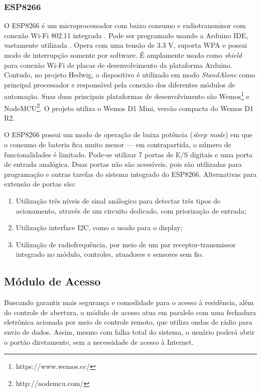 \subsubsection{ESP8266 \label{subsec:esp8266}}
O ESP8266 é um microprocessador com baixo consumo e radiotransmisor com conexão Wi-Fi 802.11 integrada \cite{espressif}. Pode ser programado usando a Arduino IDE, vastamente utilizada \cite{thomsen}. Opera com uma tensão de 3.3 V, suporta WPA e possui modo de interrupção somente por software. É amplamente usado como \textit{shield} para conexão Wi-Fi de placas de desenvolvimento da plataforma Arduino. Contudo, no projeto Hedwig, o dispositivo é utilizado em modo \textit{StandAlone} como principal processador e responsável pela conexão dos diferentes módulos de automação. Suas duas principais plataformas de desenvolvimento são Wemos\footnote{https://www.wemos.cc/} e NodeMCU\footnote{http://nodemcu.com/}. O projeto utiliza o Wemos D1 Mini, versão compacta do Wemos D1 R2.

O ESP8266 possui um modo de operação de baixa potência (\textit{sleep mode}) em que o consumo de bateria fica muito menor --- em contrapartida, o número de funcionalidades é limitado. Pode-se utilizar 7 portas de E\slash{}S digitais e uma porta de entrada analógica. Duas portas não são acessíveis, pois são utilizadas para programação e outras tarefas do sistema integrado do ESP8266. Alternativas para extensão de portas são:

\begin{enumerate}
	\item Utilização três níveis de sinal análogico para detectar três tipos de acionamento, através de um circuito dedicado, com priorização de entrada;

	\item Utilização interface I2C, como o usado para o display;

	\item Utilização de radiofrequência, por meio de um par receptor-transmissor integrado no módulo, controles, atuadores e sensores sem fio.
\end{enumerate}

\subsection{Módulo de Acesso}
\label{ssec:acessomodulo}

Buscando garantir mais segurança e comodidade para o acesso à residência, além do controle de abertura, o módulo de acesso atua em paralelo com uma fechadura eletrônica acionada por meio de controle remoto, que utiliza ondas de rádio para envio de dados. Assim, mesmo com falha total do sistema, o usuário poderá abrir o portão diretamente, sem a necessidade de acesso à Internet.

